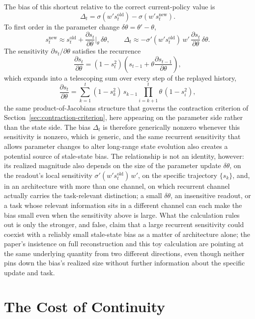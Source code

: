 \documentclass[11pt]{article}
\begin{document}
The bias of this shortcut relative to the correct current-policy value is
\[
\Delta_t = \sigma(w' s_t^{\mathrm{old}}) - \sigma(w' s_t^{\mathrm{new}}).
\]
To first order in the parameter change $\delta\theta = \theta' - \theta$,
\[
s_t^{\mathrm{new}} \approx s_t^{\mathrm{old}} + \frac{\partial s_t}{\partial \theta}\bigg|_{\theta}\, \delta\theta,
\qquad
\Delta_t \approx -\sigma'(w' s_t^{\mathrm{old}})\, w'\, \frac{\partial s_t}{\partial \theta}\, \delta\theta.
\]
The sensitivity $\partial s_t/\partial\theta$ satisfies the recurrence
\[
\frac{\partial s_t}{\partial \theta}
=
(1-s_t^2)\left(s_{t-1} + \theta \frac{\partial s_{t-1}}{\partial \theta}\right),
\]
which expands into a telescoping sum over every step of the replayed history,
\[
\frac{\partial s_t}{\partial \theta}
=
\sum_{k=1}^{t}
(1-s_k^2)\, s_{k-1}
\prod_{i=k+1}^{t} \theta\,(1 - s_i^2),
\]
the same product-of-Jacobians structure that governs the contraction criterion of Section~\ref{sec:contraction-criterion}, here appearing on the parameter side rather than the state side. The bias $\Delta_t$ is therefore generically nonzero whenever this sensitivity is nonzero, which is generic, and the same recurrent sensitivity that allows parameter changes to alter long-range state evolution also creates a potential source of stale-state bias. The relationship is not an identity, however: its realized magnitude also depends on the size of the parameter update $\delta\theta$, on the readout's local sensitivity $\sigma'(w's_t^{\mathrm{old}})\,w'$, on the specific trajectory $\{s_k\}$, and, in an architecture with more than one channel, on which recurrent channel actually carries the task-relevant distinction; a small $\delta\theta$, an insensitive readout, or a task whose relevant information sits in a different channel can each make the bias small even when the sensitivity above is large. What the calculation rules out is only the stronger, and false, claim that a large recurrent sensitivity could coexist with a reliably small stale-state bias as a matter of architecture alone; the paper's insistence on full reconstruction and this toy calculation are pointing at the same underlying quantity from two different directions, even though neither pins down the bias's realized size without further information about the specific update and task.

\section{The Cost of Continuity}
\end{document}
